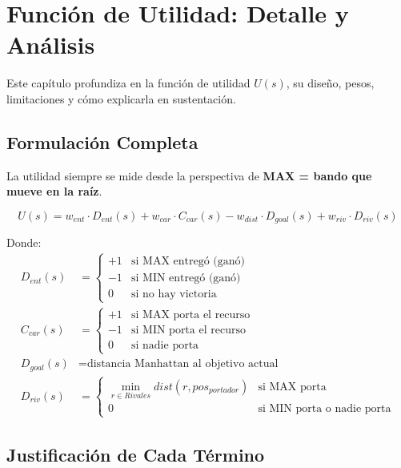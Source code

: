 \chapter{Función de Utilidad: Detalle y Análisis}
\label{ch:utilidad}

Este capítulo profundiza en la función de utilidad $U(s)$, su diseño, pesos, limitaciones y
cómo explicarla en sustentación.

\section{Formulación Completa}
\label{sec:formulacion-completa}

La utilidad siempre se mide desde la perspectiva de \textbf{MAX = bando que mueve en la raíz}.

\begin{equation}
U(s) = w_{ent} \cdot D_{ent}(s) + w_{car} \cdot C_{car}(s) - w_{dist} \cdot D_{goal}(s) + w_{riv} \cdot D_{riv}(s)
\label{eq:utilidad}
\end{equation}

Donde:
\begin{align}
D_{ent}(s) &= \begin{cases}
+1 & \text{si MAX entregó (ganó)} \\
-1 & \text{si MIN entregó (ganó)} \\
0 & \text{si no hay victoria}
\end{cases} \\
C_{car}(s) &= \begin{cases}
+1 & \text{si MAX porta el recurso} \\
-1 & \text{si MIN porta el recurso} \\
0 & \text{si nadie porta}
\end{cases} \\
D_{goal}(s) &= \text{distancia Manhattan al objetivo actual} \\
D_{riv}(s) &= \begin{cases}
\min_{r \in Rivales} dist(r, pos_{portador}) & \text{si MAX porta} \\
0 & \text{si MIN porta o nadie porta}
\end{cases}
\end{align}

\section{Justificación de Cada Término}
\label{sec:justificacion-terminos}

